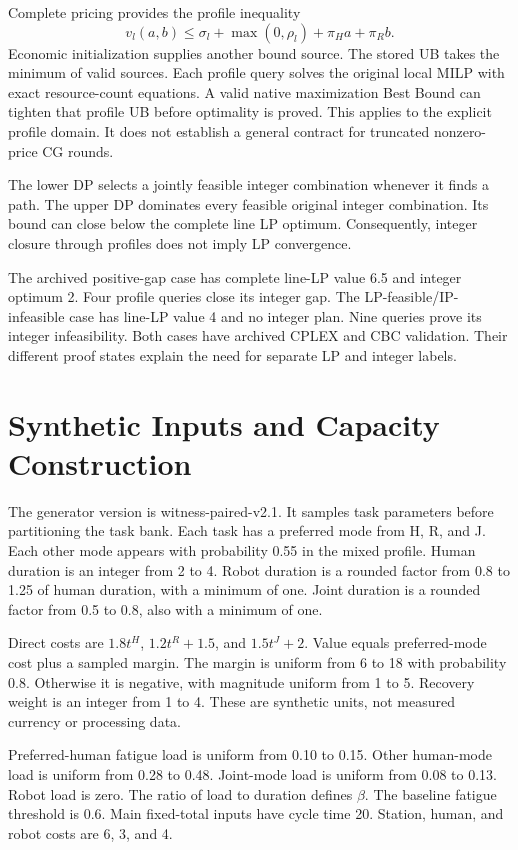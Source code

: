 \documentclass[letterpaper,journal]{IEEEtran}
\begin{document}
Complete pricing provides the profile inequality
\begin{equation}
v_l(a,b)\leq\sigma_l+\max(0,\rho_l)+\pi_Ha+\pi_Rb.
\end{equation}
Economic initialization supplies another bound source. The stored UB takes the minimum of valid sources. Each profile query solves the original local MILP with exact resource-count equations. A valid native maximization Best Bound can tighten that profile UB before optimality is proved. This applies to the explicit profile domain. It does not establish a general contract for truncated nonzero-price CG rounds.

The lower DP selects a jointly feasible integer combination whenever it finds a path. The upper DP dominates every feasible original integer combination. Its bound can close below the complete line LP optimum. Consequently, integer closure through profiles does not imply LP convergence.

The archived positive-gap case has complete line-LP value 6.5 and integer optimum 2. Four profile queries close its integer gap. The LP-feasible/IP-infeasible case has line-LP value 4 and no integer plan. Nine queries prove its integer infeasibility. Both cases have archived CPLEX and CBC validation. Their different proof states explain the need for separate LP and integer labels.

\section{Synthetic Inputs and Capacity Construction}
The generator version is witness-paired-v2.1. It samples task parameters before partitioning the task bank. Each task has a preferred mode from H, R, and J. Each other mode appears with probability 0.55 in the mixed profile. Human duration is an integer from 2 to 4. Robot duration is a rounded factor from 0.8 to 1.25 of human duration, with a minimum of one. Joint duration is a rounded factor from 0.5 to 0.8, also with a minimum of one.

Direct costs are $1.8t^H$, $1.2t^R+1.5$, and $1.5t^J+2$. Value equals preferred-mode cost plus a sampled margin. The margin is uniform from 6 to 18 with probability 0.8. Otherwise it is negative, with magnitude uniform from 1 to 5. Recovery weight is an integer from 1 to 4. These are synthetic units, not measured currency or processing data.

Preferred-human fatigue load is uniform from 0.10 to 0.15. Other human-mode load is uniform from 0.28 to 0.48. Joint-mode load is uniform from 0.08 to 0.13. Robot load is zero. The ratio of load to duration defines $\beta$. The baseline fatigue threshold is 0.6. Main fixed-total inputs have cycle time 20. Station, human, and robot costs are 6, 3, and 4.
\end{document}
